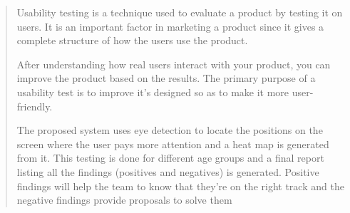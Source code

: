 \documentclass[12pt,a4paper,final]{extreport}
\begin{document}
\begin{quote}
    Usability testing is a technique used to evaluate a product by testing it on users. It is an important factor in marketing a product since it gives a complete structure of how the users use the product.

    After understanding how real users interact with your product, you can improve the product based on the results. The primary purpose of a usability test is to improve it’s designed so as to make it more user-friendly.
    
    The proposed system uses eye detection to locate the positions on the screen where the user pays more attention and a heat map is generated from it. This testing is done for different age groups and a final report listing all the findings (positives and negatives) is generated. Positive findings will help the team to know that they’re on the right track and the negative findings provide proposals to solve them
    


\end{quote}

\newpage
\tableofcontents
{}


\newpage
\listoffigures 
{}

\clearpage
{}
\chead{}
\rhead{}
\cfoot{}
\rfoot{\thepage}
\renewcommand{\headrulewidth}{0.4pt}
\renewcommand{\footrulewidth}{0.4pt}
\pagestyle{fancy}


\end{document}
